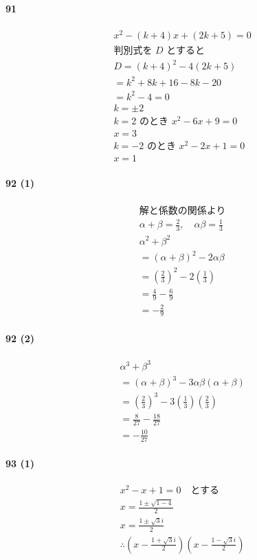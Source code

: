 \documentclass[fleqn,a4j,dvipdfmx,uplatex,twocolumn]{jsarticle}
\begin{document}
\paragraph{91}
\begin{align*}
  &x^{2}-(k+4)x+(2k+5)=0 \\
  &\text{判別式を } D \text{ とすると} \\
  &D=(k+4)^{2}-4(2k+5) \\
  &=k^{2}+8k+16-8k-20 \\
  &=k^{2}-4=0 \\
  &k=\pm 2 \\
  &k=2 \text{ のとき } x^{2}-6x+9=0 \\
  &x=3 \\
  &k=-2 \text{ のとき } x^{2}-2x+1=0 \\
  &x=1
\end{align*}

\paragraph{92 (1)}
\begin{align*}
  &\text{解と係数の関係より} \\
  &\alpha+\beta = \frac{2}{3}, \quad \alpha\beta = \frac{1}{3} \\
  &\alpha^{2}+\beta^{2} \\
  &= (\alpha+\beta)^{2}-2\alpha\beta \\
  &= \left(\frac{2}{3}\right)^{2}-2\left(\frac{1}{3}\right) \\
  &= \frac{4}{9}-\frac{6}{9} \\
  &= -\frac{2}{9}
\end{align*}

\paragraph{92 (2)}
\begin{align*}
  &\alpha^{3}+\beta^{3} \\
  &= (\alpha+\beta)^{3}-3\alpha\beta(\alpha+\beta) \\
  &= \left(\frac{2}{3}\right)^{3}-3\left(\frac{1}{3}\right)\left(\frac{2}{3}\right) \\
  &= \frac{8}{27}-\frac{18}{27} \\
  &= -\frac{10}{27}
\end{align*}

\paragraph{93 (1)}
\begin{align*}
  &x^{2}-x+1=0 \quad \text{とする} \\
  &x = \frac{1 \pm \sqrt{1-4}}{2} \\
  &x = \frac{1 \pm \sqrt{3}i}{2} \\
  &\therefore \left(x-\frac{1+\sqrt{3}i}{2}\right)\left(x-\frac{1-\sqrt{3}i}{2}\right)
\end{align*}
\end{document}
